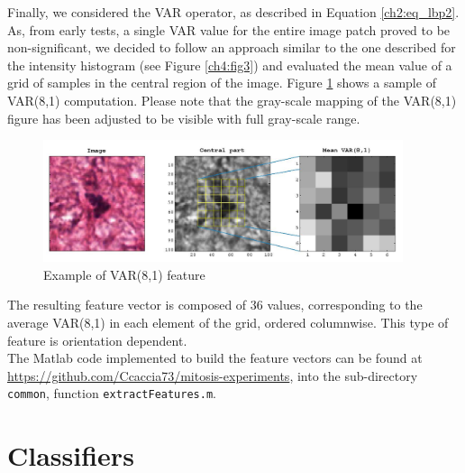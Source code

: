 Finally, we considered the \Gls{VAR} operator, as described in Equation \ref{ch2:eq_lbp2}. As, from early tests, a single \Gls{VAR} value for the entire image patch proved to be non-significant, we
decided to follow an approach similar to the one described for the intensity histogram (see Figure \ref{ch4:fig3}) and evaluated the mean value of a grid of samples in the central
region of the image. Figure \ref{ch4:fig4} shows a sample of VAR(8,1) computation. Please note that the gray-scale mapping of the VAR(8,1) figure has been adjusted to be visible with full gray-scale range.

\begin{figure}[!hbt]
  \centering
    \includegraphics[width=0.94\textwidth]{./images/GS_VAR_mod1.png}
  \caption[Example of VAR(8,1) feature]{Example of VAR(8,1) feature}
  \label{ch4:fig4}
\end{figure}

The resulting feature vector is composed of 36 values, corresponding to the average VAR(8,1) in each element of the grid, ordered columnwise. This type of feature is orientation dependent.
\\
The Matlab code implemented to build the feature vectors can be found at \url{https://github.com/Ccaccia73/mitosis-experiments}, into the sub-directory \texttt{common},
function \texttt{extractFeatures.m}.






\vspace{0.5cm}


\section{Classifiers}
\label{ch4:classifiers}

